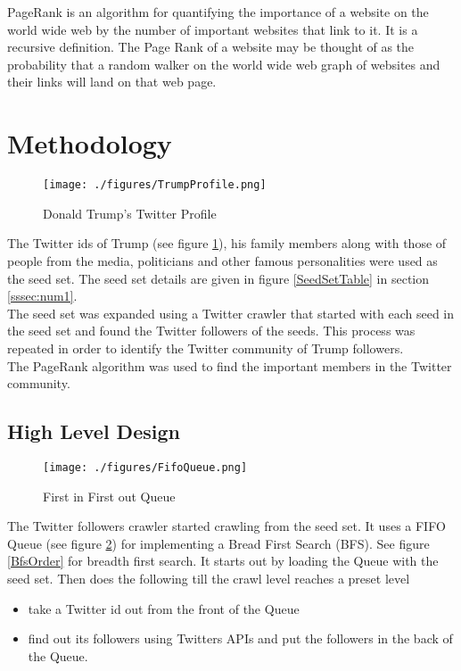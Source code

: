 \documentclass{sig-alternate-05-2015}
\begin{document}
PageRank is an algorithm for quantifying the importance of a website on the world wide web by the number of important websites that link to it. It is a recursive definition. The Page Rank of a website may be thought of as the probability that a random walker on the world wide web graph of websites and their links will land on that web page.

\section{Methodology}
\begin{figure}[!t]
\centering
\texttt{[image: ./figures/TrumpProfile.png]}
\caption{Donald Trump's Twitter Profile}
\label{TrumpProfile}
\end{figure}
The Twitter ids of Trump (see figure \ref{TrumpProfile}), his family members along with those of people from the media, politicians and other famous personalities were used as the seed set\cite{SeedSource}. The seed set details are given in figure \ref{SeedSetTable} in section \ref{sssec:num1}.\\

The seed set was expanded using a Twitter crawler that started with each seed in the seed set and found the Twitter followers of the seeds. This process was repeated in order to identify the Twitter community of Trump followers.\\

The PageRank algorithm was used to find the important members in the Twitter community.

\subsection{High Level Design}
\begin{figure}[!t]
\centering
\texttt{[image: ./figures/FifoQueue.png]}
\caption{First in First out Queue\cite{Queue}}
\label{FifoQueue}
\end{figure}
The Twitter followers crawler started crawling from the seed set. It uses a FIFO Queue (see figure \ref{FifoQueue}) for implementing a Bread First Search (BFS). See figure \ref{BfsOrder} for breadth first search. It starts out by loading the Queue with the seed set. Then does the following till the crawl level reaches a preset level

\begin{itemize}
\item take a Twitter id out from the front of the Queue
\item find out its followers using Twitters APIs and put the followers in the back of the Queue.
\end{itemize}
\end{document}
